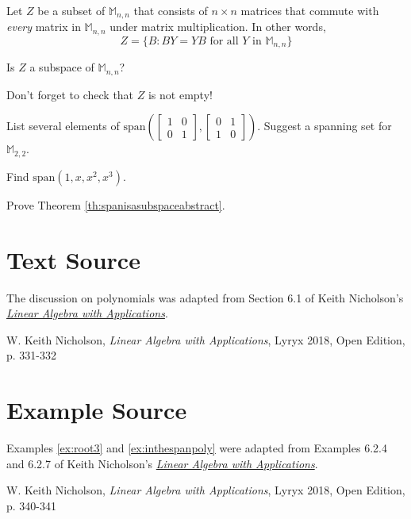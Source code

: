 \documentclass{ximera}
\begin{document}
\begin{problem}
Let $Z$ be a subset of $\mathbb{M}_{n,n}$ that consists of $n\times n$ matrices that commute with {\it every} matrix in $\mathbb{M}_{n,n}$ under matrix multiplication. In other words,
$$Z=\{B : BY=YB \mbox{ for all } Y \mbox{ in } \mathbb{M}_{n,n}\}$$

Is $Z$ a subspace of $\mathbb{M}_{n,n}$?

\begin{hint}
Don't forget to check that $Z$ is not empty!
\end{hint}
\end{problem}

\begin{problem}
List several elements of $\mbox{span}\left(\begin{bmatrix}1&0\\0&1\end{bmatrix}, \begin{bmatrix}0&1\\1&0\end{bmatrix}\right)$.  Suggest a spanning set for $\mathbb{M}_{2,2}$.
\end{problem}

\begin{problem}
Find $\mbox{span}(1, x, x^2, x^3)$.
\end{problem}

\begin{problem}\label{prob:spanisasubspaceabstract}
Prove Theorem \ref{th:spanisasubspaceabstract}.
\end{problem}

\section*{Text Source} The discussion on polynomials was adapted from Section 6.1 of Keith Nicholson's \href{https://open.umn.edu/opentextbooks/textbooks/linear-algebra-with-applications}{\it Linear Algebra with Applications}.

W. Keith Nicholson, {\it Linear Algebra with Applications}, Lyryx 2018, Open Edition, p. 331-332 

\section*{Example Source}
Examples \ref{ex:root3} and \ref{ex:inthespanpoly} were adapted from Examples 6.2.4 and 6.2.7 of Keith Nicholson's \href{https://open.umn.edu/opentextbooks/textbooks/linear-algebra-with-applications}{\it Linear Algebra with Applications}.

W. Keith Nicholson, {\it Linear Algebra with Applications}, Lyryx 2018, Open Edition, p. 340-341 
\end{document}
